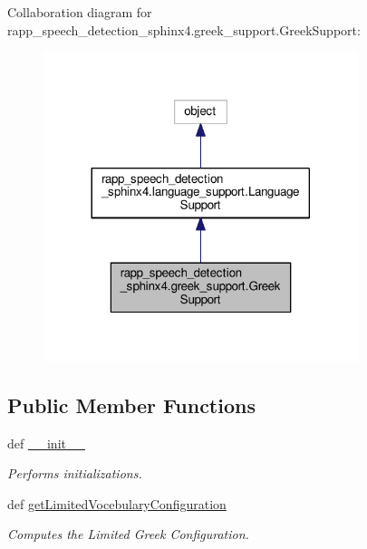 Collaboration diagram for rapp\-\_\-speech\-\_\-detection\-\_\-sphinx4.\-greek\-\_\-support.\-Greek\-Support\-:
\nopagebreak
\begin{figure}[H]
\begin{center}
\leavevmode
\includegraphics[width=260pt]{classrapp__speech__detection__sphinx4_1_1greek__support_1_1GreekSupport__coll__graph}
\end{center}
\end{figure}
\subsection*{Public Member Functions}
\begin{DoxyCompactItemize}
\item 
def \hyperlink{classrapp__speech__detection__sphinx4_1_1greek__support_1_1GreekSupport_a11ade953742b11f592db3fdee75d97c1}{\-\_\-\-\_\-init\-\_\-\-\_\-}
\begin{DoxyCompactList}\small\item\em Performs initializations. \end{DoxyCompactList}\item 
def \hyperlink{classrapp__speech__detection__sphinx4_1_1greek__support_1_1GreekSupport_aaf3225dba3273dbd5fd7b01944e20289}{get\-Limited\-Vocebulary\-Configuration}
\begin{DoxyCompactList}\small\item\em Computes the Limited Greek Configuration. \end{DoxyCompactList}\end{DoxyCompactItemize}
